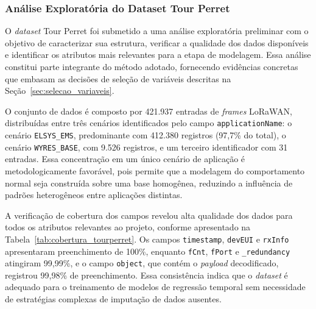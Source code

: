 
\subsubsection{Análise Exploratória do Dataset Tour Perret}

O \textit{dataset} Tour Perret foi submetido a uma análise exploratória 
preliminar com o objetivo de caracterizar sua estrutura, verificar a 
qualidade dos dados disponíveis e identificar os atributos mais relevantes 
para a etapa de modelagem. Essa análise constitui parte integrante do método 
adotado, fornecendo evidências concretas que embasam as decisões de seleção 
de variáveis descritas na Seção~\ref{sec:selecao_variaveis}.

O conjunto de dados é composto por 421.937 entradas de \textit{frames} 
LoRaWAN, distribuídas entre três cenários identificados pelo campo 
\texttt{applicationName}: o cenário \texttt{ELSYS\_EMS}, predominante com 
412.380 registros (97,7\% do total), o cenário \texttt{WYRES\_BASE}, com 
9.526 registros, e um terceiro identificador com 31 entradas. Essa 
concentração em um único cenário de aplicação é metodologicamente favorável, 
pois permite que a modelagem do comportamento normal seja construída sobre 
uma base homogênea, reduzindo a influência de padrões heterogêneos entre 
aplicações distintas.

A verificação de cobertura dos campos revelou alta qualidade dos dados para 
todos os atributos relevantes ao projeto, conforme apresentado na 
Tabela~\ref{tab:cobertura_tourperret}. Os campos \texttt{timestamp}, 
\texttt{devEUI} e \texttt{rxInfo} apresentaram preenchimento de 100\%, 
enquanto \texttt{fCnt}, \texttt{fPort} e \texttt{\_redundancy} atingiram 
99,99\%, e o campo \texttt{object}, que contém o \textit{payload} 
decodificado, registrou 99,98\% de preenchimento. Essa consistência indica 
que o \textit{dataset} é adequado para o treinamento de modelos de regressão 
temporal sem necessidade de estratégias complexas de imputação de dados 
ausentes.

